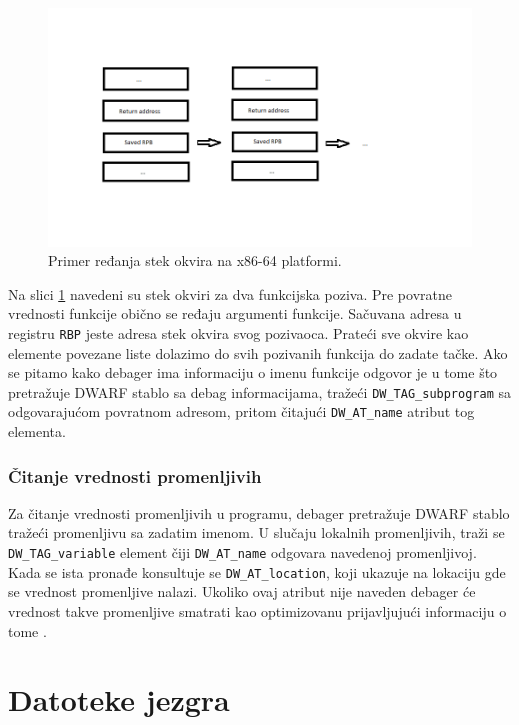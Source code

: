 \documentclass[12pt,oneside]{memoir}
\begin{document}
\begin{figure}[h!]
	\begin{center}
		\includegraphics[scale=0.6]{slike/stack_frame.png}
	\end{center}
	\caption{Primer ređanja stek okvira na x86-64 platformi.}
	\label{fig:stack}
\end{figure}

Na slici \ref{fig:stack} navedeni su stek okviri za dva funkcijska poziva. Pre povratne vrednosti funkcije obično se ređaju argumenti funkcije. Sačuvana adresa u registru \texttt{RBP} jeste adresa stek okvira svog pozivaoca. Prateći sve okvire kao elemente povezane liste dolazimo do svih pozivanih funkcija do zadate tačke. Ako se pitamo kako debager ima informaciju o imenu funkcije odgovor je u tome što pretražuje DWARF stablo sa debag informacijama, tražeći \texttt{DW\_TAG\_subprogram} sa odgovarajućom povratnom adresom, pritom čitajući \texttt{DW\_AT\_name} atribut tog elementa.

\subsection{Čitanje vrednosti promenljivih}

Za čitanje vrednosti promenljivih u programu, debager pretražuje DWARF stablo tražeći promenljivu sa zadatim imenom. U slučaju lokalnih promenljivih, traži se \texttt{DW\_TAG\_variable} element čiji \texttt{DW\_AT\_name} odgovara navedenoj promenljivoj. Kada se ista pronađe konsultuje se \texttt{DW\_AT\_location}, koji ukazuje na lokaciju gde se vrednost promenljive nalazi. Ukoliko ovaj atribut nije naveden debager će vrednost takve promenljive smatrati kao optimizovanu prijavljujući informaciju o tome \cite{GDB}.

\chapter{Datoteke jezgra}
\label{chp:corefiles}
\end{document}

